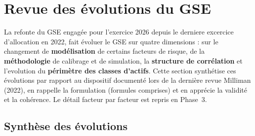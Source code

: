 \documentclass[11pt,a4paper]{article}
\begin{document}
\clearpage
\section{Revue des évolutions du GSE}
\label{sec:evolutions}

La refonte du GSE engagée pour l'exercice 2026 depuis le derniere excercice d'allocation en 2022,  fait évoluer le GSE sur quatre dimensions : sur le changement de \textbf{modélisation} de certains facteurs de risque, de la \textbf{méthodologie} de calibrage et de simulation, la \textbf{structure de corrélation} et l'evolution du \textbf{périmètre des classes d'actifs}. Cette section synthétise ces évolutions par rapport au dispositif documenté lors de la dernière revue Milliman (2022), en rappelle la formulation (formules comprises) et en apprécie la validité et la cohérence. Le détail facteur par facteur est repris en Phase~3.

\subsection{Synthèse des évolutions}
\end{document}
